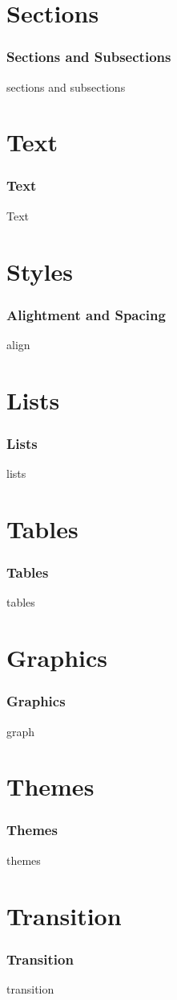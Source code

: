 \documentclass[aspectratio=169,utf8]{ctexbeamer}
\begin{document}
\section*{Sections}
\begin{frame}
  \frametitle{Sections and Subsections}

  sections and subsections
\end{frame}

\section*{Text}
\begin{frame}
  \frametitle{Text}
  Text
\end{frame}

\section*{Styles}
\begin{frame}
  \frametitle{Alightment and Spacing}
  align
\end{frame}

\section*{Lists}
\begin{frame}
  \frametitle{Lists}
  lists
\end{frame}

\section*{Tables}
\begin{frame}
  \frametitle{Tables}
  tables
\end{frame}

\section*{Graphics}
\begin{frame}
  \frametitle{Graphics}
  graph
\end{frame}

\section*{Themes}
\begin{frame}
  \frametitle{Themes}
  themes
\end{frame}

\section*{Transition}
\begin{frame}
  \frametitle{Transition}
  transition
\end{frame}
\end{document}
